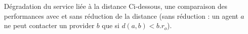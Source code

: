 \begin{hypothese}{Dégradation du service liée à la distance}
Ci-dessous, une comparaison des performances avec et sans réduction de la distance (sans réduction : un agent $a$ ne peut contacter un provider $b$ que si $d(a,b) < b.r_o$).



\end{hypothese}

\vspace{10pt}
